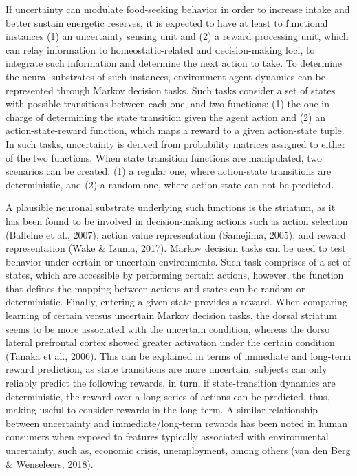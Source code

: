 \documentclass[
]{/home/nicoluarte/Downloads/templates/PNAS-template-main.tex}
\begin{document}
If uncertainty can modulate food-seeking behavior in order to increase
intake and better sustain energetic reserves, it is expected to have at
least to functional instances (1) an uncertainty sensing unit and (2) a
reward processing unit, which can relay information to
homeostatic-related and decision-making loci, to integrate such
information and determine the next action to take. To determine the
neural substrates of such instances, environment-agent dynamics can be
represented through Markov decision tasks. Such tasks consider a set of
states with possible transitions between each one, and two functions:
(1) the one in charge of determining the state transition given the
agent action and (2) an action-state-reward function, which maps a
reward to a given action-state tuple. In such tasks, uncertainty is
derived from probability matrices assigned to either of the two
functions. When state transition functions are manipulated, two
scenarios can be created: (1) a regular one, where action-state
transitions are deterministic, and (2) a random one, where action-state
can not be predicted.

A plausible neuronal substrate underlying such functions is the
striatum, as it has been found to be involved in decision-making actions
such as action selection (Balleine et al., 2007), action value
representation (Samejima, 2005), and reward representation (Wake \&
Izuma, 2017). Markov decision tasks can be used to test behavior under
certain or uncertain environments. Such task comprises of a set of
states, which are accessible by performing certain actions, however, the
function that defines the mapping between actions and states can be
random or deterministic. Finally, entering a given state provides a
reward. When comparing learning of certain versus uncertain Markov
decision tasks, the dorsal striatum seems to be more associated with the
uncertain condition, whereas the dorso lateral prefrontal cortex showed
greater activation under the certain condition (Tanaka et al., 2006).
This can be explained in terms of immediate and long-term reward
prediction, as state transitions are more uncertain, subjects can only
reliably predict the following rewards, in turn, if state-transition
dynamics are deterministic, the reward over a long series of actions can
be predicted, thus, making useful to consider rewards in the long term.
A similar relationship between uncertainty and immediate/long-term
rewards has been noted in human consumers when exposed to features
typically associated with environmental uncertainty, such as, economic
crisis, unemployment, among others (van den Berg \& Wenseleers, 2018).
\end{document}
